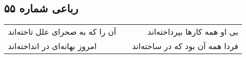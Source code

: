 \begin{center}
\section*{رباعی شماره ۵۵}
\label{sec:sh055}
\begin{longtable}{l p{0.5cm} r}
آن را که به صحرای علل تاخته‌اند
&&
بی او همه کارها بپرداخته‌اند
\\
امروز بهانه‌ای در انداخته‌اند
&&
فردا همه آن بود که در ساخته‌اند
\\
\end{longtable}
\end{center}

